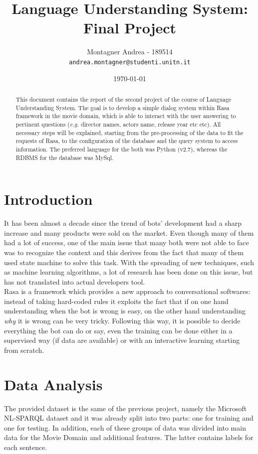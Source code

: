 \documentclass[11pt,a4paper]{article}
\title{Language Understanding System: Final Project}
\author{Montagner Andrea - 189514\\
  {\tt andrea.montagner@studenti.unitn.it}}
\date{\today}
\begin{document}
\maketitle
\begin{abstract}
  This document contains the report of the second project of the course of Language Understanding System. The goal is to develop a simple dialog system within Rasa framework in the movie domain, which is able to interact with the user answering to pertinent questions (\textit{e.g.} director names, actors name, release year etc etc). All necessary steps will be explained, starting from the pre-processing of the data to fit the requests of Rasa, to the configuration of the database and the query system to access information. The preferred language for the both was Python (v2.7), whereas the RDBMS for the database was MySql.
\end{abstract}

\section{Introduction}

It has been almost a decade since the trend of bots' development had a sharp increase and many products were sold on the market. Even though many of them had a lot of success, one of the main issue that many both were not able to face was to recognize the context and this derives from the fact that many of them used state machine to solve this task. With the spreading of new techniques, such as machine learning algorithms, a lot of research has been done on this issue, but has not translated into actual developers tool.\\

Rasa is a framework which provides a new approach to conversational softwares: instead of taking hard-coded rules it exploits the fact that if on one hand understanding when the bot is wrong is easy, on the other hand understanding \textit{why} it is wrong can be very tricky. Following this way, it is possible to decide everything the bot can do or say, even the training can be done either in a supervised way (if data are available) or with an interactive learning starting from scratch.

\section{Data Analysis}

The provided dataset is the same of the previous project, namely the Microsoft NL-SPARQL dataset and it was already split into two parts: one for training and one for testing. In addition, each of these groups of data was divided into main data for the Movie Domain and additional features. The latter contains labels for each sentence.
\end{document}
